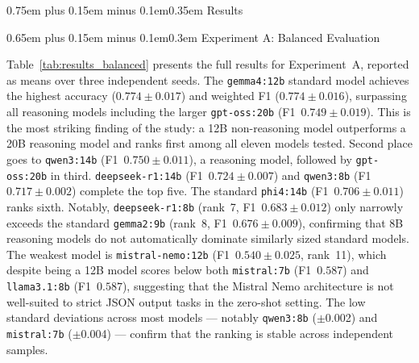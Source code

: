 \documentclass[10pt,a4paper,twocolumn]{article}
\makeatletter
\renewcommand\section{\@startsection{section}{1}{0pt}%
  {0.75em plus 0.15em minus 0.1em}{0.35em}%
  {\normalfont\normalsize\itshape}}
\renewcommand\subsection{\@startsection{subsection}{2}{0pt}%
  {0.65em plus 0.15em minus 0.1em}{0.3em}%
  {\normalfont\normalsize\itshape}}
\makeatother
\begin{document}
\section{Results}
\label{sec:results}

\subsection{Experiment A: Balanced Evaluation}

Table~\ref{tab:results_balanced} presents the full results for
Experiment~A, reported as means over three independent seeds.
The \texttt{gemma4:12b} standard model achieves the
highest accuracy ($0.774 \pm 0.017$) and weighted F1 ($0.774 \pm 0.016$),
surpassing all reasoning models including the larger
\texttt{gpt-oss:20b} (F1~$0.749 \pm 0.019$). This is the most striking
finding of the study: a 12B non-reasoning model outperforms a 20B
reasoning model and ranks first among all eleven models tested.
Second place goes to \texttt{qwen3:14b} (F1~$0.750 \pm 0.011$),
a reasoning model, followed by \texttt{gpt-oss:20b} in third.
\texttt{deepseek-r1:14b} (F1~$0.724 \pm 0.007$) and
\texttt{qwen3:8b} (F1~$0.717 \pm 0.002$) complete the top five.
The standard \texttt{phi4:14b} (F1~$0.706 \pm 0.011$) ranks sixth.
Notably, \texttt{deepseek-r1:8b} (rank~7, F1~$0.683 \pm 0.012$)
only narrowly exceeds the standard \texttt{gemma2:9b} (rank~8,
F1~$0.676 \pm 0.009$), confirming that 8B reasoning models do not
automatically dominate similarly sized standard models. The weakest model is \texttt{mistral-nemo:12b}
(F1~$0.540 \pm 0.025$, rank~11), which despite being a 12B model
scores below both \texttt{mistral:7b} (F1~$0.587$) and
\texttt{llama3.1:8b} (F1~$0.587$), suggesting that the Mistral Nemo
architecture is not well-suited to strict JSON output tasks in the
zero-shot setting. The low standard deviations across most models ---
notably \texttt{qwen3:8b} ($\pm$0.002) and \texttt{mistral:7b}
($\pm$0.004) --- confirm that the ranking is stable across independent
samples.
\end{document}
